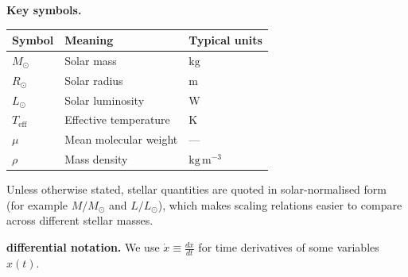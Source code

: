 \bigskip
\noindent\textbf{Key symbols.}
\begin{center}
\begin{tabular}{@{}lll@{}}
  \toprule
  Symbol & Meaning & Typical units \\
  \midrule
  $M_\odot$                & Solar mass                        & $\mathrm{kg}$ \\
  $R_\odot$                & Solar radius                      & $\mathrm{m}$ \\
  $L_\odot$                & Solar luminosity                  & $\mathrm{W}$ \\
  $T_\mathrm{eff}$         & Effective temperature             & $\mathrm{K}$ \\
  $\mu$                    & Mean molecular weight             & --- \\
  $\rho$                   & Mass density                      & $\mathrm{kg\,m^{-3}}$ \\
  \bottomrule
\end{tabular}
\end{center}

\begin{remark}
  Unless otherwise stated, stellar quantities are quoted in solar-normalised form
  (for example $M/M_\odot$ and $L/L_\odot$), which makes scaling relations easier
  to compare across different stellar masses.
\end{remark}

\bigskip \noindent
\textbf{differential notation.}\quad
We use $\dot{x} \equiv \frac{dx}{dt}$ for time derivatives of some variables $x(t)$.

\clearpage
